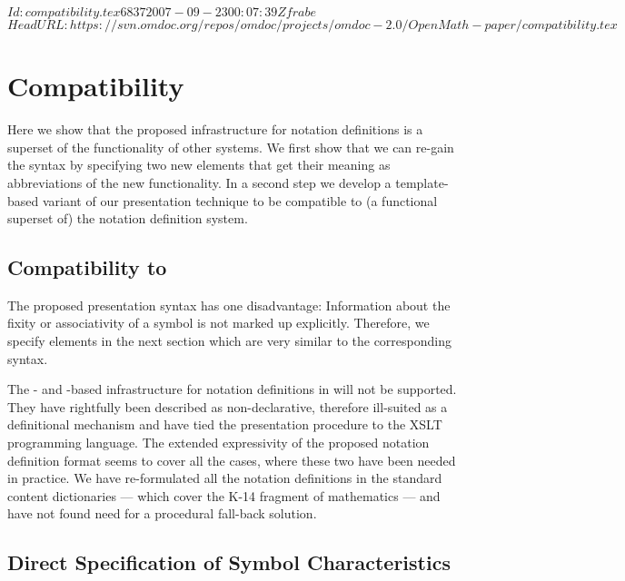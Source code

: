 \svnInfo $Id: compatibility.tex 6837 2007-09-23 00:07:39Z frabe $
\svnKeyword $HeadURL: https://svn.omdoc.org/repos/omdoc/projects/omdoc-2.0/OpenMath-paper/compatibility.tex $
\section{Compatibility}\label{sec:templates}
Here we show that the proposed infrastructure for notation definitions is a superset of
the functionality of other systems. We first show that we can re-gain the {}
syntax by specifying two new elements that get their meaning as abbreviations of the new
functionality. In a second step we develop a template-based variant of our presentation
technique to be compatible to (a functional superset of) the {\activemath} notation
definition system. 

\subsection{Compatibility to {}}

The proposed presentation syntax has one disadvantage: Information about the fixity or
associativity of a symbol is not marked up explicitly. Therefore, we specify
{} elements in the next section which are very similar to the corresponding
{} syntax.

The {}- and {}-based infrastructure for notation definitions
in {} will not be supported. They have rightfully been described as
non-declarative, therefore ill-suited as a definitional mechanism and have tied the
presentation procedure to the XSLT programming language. The extended expressivity of the
proposed notation definition format seems to cover all the cases, where these two have
been needed in practice. We have re-formulated all the notation
definitions in the {\openmath} standard content dictionaries --- which cover the K-14
fragment of mathematics --- and have not found need for a procedural fall-back solution.


\subsection{Direct Specification of Symbol Characteristics}

